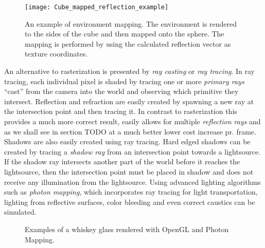 \begin{figure}
  \centering
  \texttt{[image: Cube\_mapped\_reflection\_example]}
  \caption{An example of environment mapping. The environment is
    rendered to the sides of the cube and then mapped onto the sphere.
    The mapping is performed by using the calculated reflection vector
    as texture coordinates.}
  \label{fig:cubemap}
\end{figure}

An alternative to rasterization is presented by \textit{ray casting}
or \textit{ray tracing}. In ray tracing, each individual pixel is
shaded by tracing one or more \textit{primary rays} ``cast'' from the
camera into the world and observing which primitive they
intersect. Reflection and refraction are easily created by spawning a
new ray at the intersection point and then tracing it. In contrast to
rasterization this provides a much more correct result, easily allows
for multiple \textit{reflection rays} and as we shall see in section
TODO at a much better lower cost increase pr. frame. Shadows are also
easily created using ray tracing. Hard edged shadows can be created by
tracing a \textit{shadow ray} from an intersection point towards a
lightsource. If the shadow ray intersects another part of the world
before it reaches the lightsource, then the intersection point must be
placed in shadow and does not receive any illumination from the
lightsource. Using advanced lighting algorithms such as \textit{photon
  mapping}, which incorporates ray tracing for light transportation,
lighting from reflective surfaces, color bleeding and even correct
caustics can be simulated.

\begin{figure}
  \centering


  \caption{Examples of a whiskey glass rendered with OpenGL and Photon
  Mapping.}
  \label{fig:caustics}
\end{figure}


